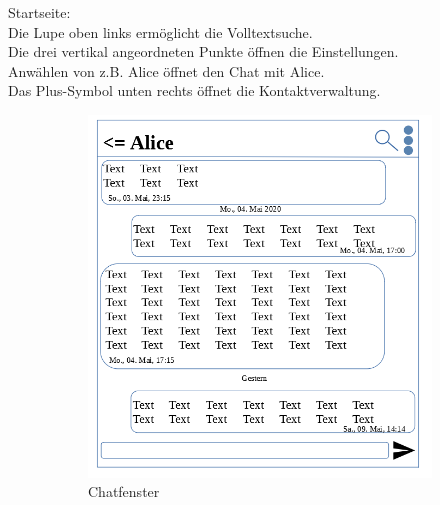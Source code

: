 Startseite:\\
Die Lupe oben links ermöglicht die Volltextsuche.\\
Die drei vertikal angeordneten Punkte öffnen die Einstellungen.\\
Anwählen von z.B. Alice öffnet den Chat mit Alice.\\
Das Plus-Symbol unten rechts öffnet die Kontaktverwaltung.\\
\newpage

\begin{figure}[h]
\centering
\begin{subfigure}{.5\textwidth}
  \centering
  \includegraphics[scale=0.3]{gui/Chatfenster.png}
  \caption{Chatfenster}
\end{subfigure}%
\begin{subfigure}{.5\textwidth}
  \centering

\end{subfigure}
\end{figure}
